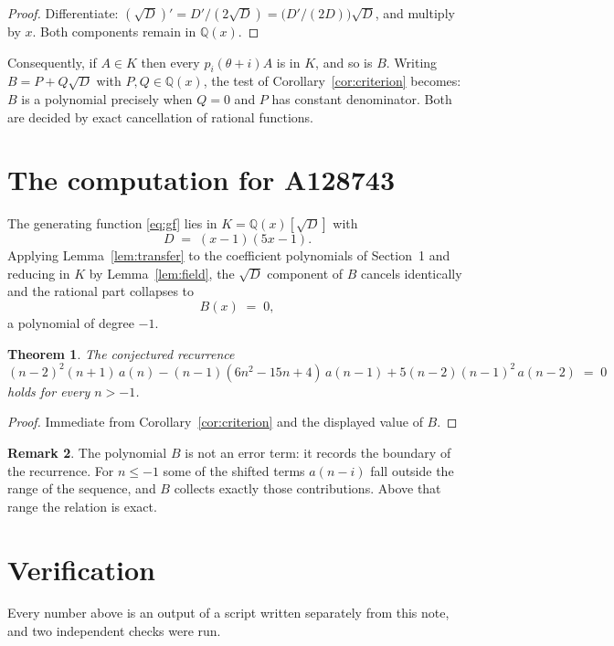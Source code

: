 \documentclass[11pt,a4paper]{article}
\theoremstyle{plain}
\newtheorem{theorem}{Theorem}
\theoremstyle{definition}
\newtheorem{remark}[theorem]{Remark}
\begin{document}
\begin{proof}
Differentiate: $(\sqrt{D})'=D'/(2\sqrt{D})=\bigl(D'/(2D)\bigr)\sqrt{D}$, and multiply by
$x$. Both components remain in $\mathbb{Q}(x)$.
\end{proof}

Consequently, if $A\in K$ then every $p_{i}(\theta+i)A$ is in $K$, and so is $B$. Writing
$B=P+Q\sqrt{D}$ with $P,Q\in\mathbb{Q}(x)$, the test of Corollary~\ref{cor:criterion}
becomes: $B$ is a polynomial precisely when $Q=0$ and $P$ has constant denominator. Both
are decided by exact cancellation of rational functions.

\section{The computation for A128743}

The generating function \eqref{eq:gf} lies in $K=\mathbb{Q}(x)[\sqrt{D}]$ with
\[
D \;=\; \left(x - 1\right) \left(5 x - 1\right) .
\]
Applying Lemma~\ref{lem:transfer} to the coefficient polynomials of Section~1 and reducing
in $K$ by Lemma~\ref{lem:field}, the $\sqrt{D}$ component of $B$ cancels identically and
the rational part collapses to
\[
B(x)\;=\;0 ,
\]
a polynomial of degree $-1$.

\begin{theorem}
The conjectured recurrence
\[
\left(n - 2\right)^{2} \left(n + 1\right)\,a(n) -  \left(n - 1\right) \left(6 n^{2} - 15 n + 4\right)\,a(n-1) + 5 \left(n - 2\right) \left(n - 1\right)^{2}\,a(n-2) \;=\;0
\]
holds for every $n>-1$.
\end{theorem}

\begin{proof}
Immediate from Corollary~\ref{cor:criterion} and the displayed value of $B$.
\end{proof}

\begin{remark}
The polynomial $B$ is not an error term: it records the boundary of the recurrence. For
$n\le-1$ some of the shifted terms $a(n-i)$ fall outside the range of the sequence,
and $B$ collects exactly those contributions. Above that range the relation is exact.
\end{remark}

\section{Verification}

Every number above is an output of a script written separately from this note, and two
independent checks were run.
\end{document}
